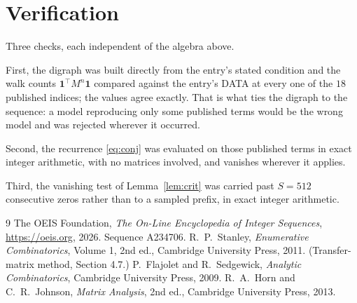 \documentclass[11pt,a4paper]{article}
\theoremstyle{plain}
\theoremstyle{definition}
\begin{document}
\section{Verification}

Three checks, each independent of the algebra above.

First, the digraph was built directly from the entry's stated condition and the walk counts
$\mathbf{1}^{\!\top}M^{n}\mathbf{1}$ compared against the entry's DATA at every one of
the $18$ published indices; the values agree exactly. That is what ties the digraph to
the sequence: a model reproducing only some published terms would be the wrong model and
was rejected wherever it occurred.

Second, the recurrence \eqref{eq:conj} was evaluated on those published terms in exact
integer arithmetic, with no matrices involved, and vanishes wherever it applies.

Third, the vanishing test of Lemma~\ref{lem:crit} was carried past $S=512$ consecutive
zeros rather than to a sampled prefix, in exact integer arithmetic.

\begin{thebibliography}{9}
 The OEIS Foundation, \emph{The On-Line Encyclopedia of Integer
Sequences}, \url{https://oeis.org}, 2026. Sequence A234706.
 R.~P.~Stanley, \emph{Enumerative Combinatorics}, Volume 1, 2nd ed.,
Cambridge University Press, 2011. (Transfer-matrix method, Section 4.7.)
 P.~Flajolet and R.~Sedgewick, \emph{Analytic Combinatorics}, Cambridge
University Press, 2009.
 R.~A.~Horn and C.~R.~Johnson, \emph{Matrix Analysis}, 2nd ed., Cambridge
University Press, 2013.
\end{thebibliography}
\end{document}
